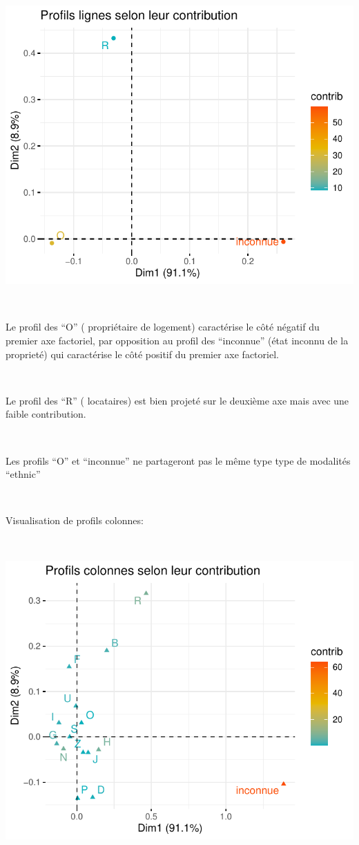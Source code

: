 \documentclass[]{imsart}
\numberwithin{equation}{section}
\theoremstyle{plain}
\begin{document}
\begin{flushleft}\includegraphics{Analyse_Exploratoire_Projet_files/figure-latex/unnamed-chunk-28-1} \end{flushleft}

~

Le profil des ``O'' ( propriétaire de logement) caractérise le côté négatif du premier axe factoriel, par opposition au profil des ``inconnue'' (état inconnu de la proprieté) qui caractérise le côté positif du premier axe factoriel.

~

Le profil des ``R'' ( locataires) est bien projeté sur le deuxième axe mais avec une faible contribution.

~

Les profils ``O'' et ``inconnue'' ne partageront pas le même type type de modalités ``ethnic''

~

Visualisation de profils colonnes:

~

\begin{flushleft}\includegraphics{Analyse_Exploratoire_Projet_files/figure-latex/unnamed-chunk-29-1} \end{flushleft}
\end{document}
